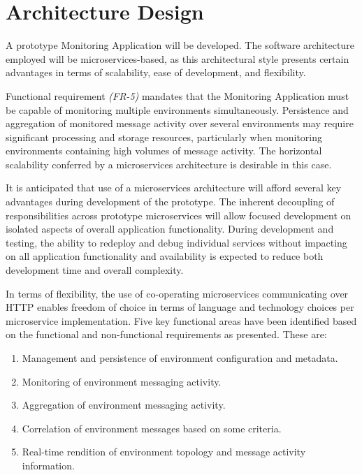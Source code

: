 \section{Architecture Design}

A prototype Monitoring Application will be developed. The software architecture employed will be microservices-based, as this architectural style presents certain advantages in terms of scalability, ease of development, and flexibility.

Functional requirement \textit{(FR-5)} mandates that the Monitoring Application must be capable of monitoring multiple environments simultaneously. Persistence and aggregation of monitored message activity over several environments may require significant processing and storage resources, particularly when monitoring environments containing high volumes of message activity. The horizontal scalability conferred by a microservices architecture is desirable in this case.

It is anticipated that use of a microservices architecture will afford several key advantages during development of the prototype. The inherent decoupling of responsibilities across prototype microservices will allow focused development on isolated aspects of overall application functionality. During development and testing, the ability to redeploy and debug individual services without impacting on all application functionality and availability is expected to reduce both development time and overall complexity. 

In terms of flexibility, the use of co-operating microservices communicating over HTTP enables freedom of choice in terms of language and technology choices per microservice implementation.
Five key functional areas have been identified based on the functional and non-functional requirements as presented. These are:

\begin{enumerate}
	\item Management and persistence of environment configuration and metadata.
	\item Monitoring of environment messaging activity.
	\item Aggregation of environment messaging activity.
	\item Correlation of environment messages based on some criteria.
	\item Real-time rendition of environment topology and message activity information.
\end{enumerate}

